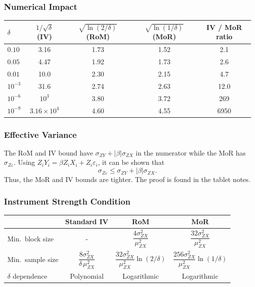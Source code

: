 \subsubsection{Numerical Impact}
 
\begin{center}
\renewcommand{\arraystretch}{1.3}
\begin{tabular}{lcccc}
\toprule
$\delta$ & $1/\sqrt{\delta}$ (IV) & $\sqrt{\ln(2/\delta)}$ (RoM) & $\sqrt{\ln(1/\delta)}$ (MoR) & IV / MoR ratio \\
\midrule
$0.10$ & 3.16 & 1.73 & 1.52 & 2.1 \\
$0.05$ & 4.47 & 1.92 & 1.73 & 2.6 \\
$0.01$ & 10.0 & 2.30 & 2.15 & 4.7 \\
$10^{-3}$ & 31.6 & 2.74 & 2.63 & 12.0 \\
$10^{-6}$ & $10^3$ & 3.80 & 3.72 & 269 \\
$10^{-9}$ & $3.16 \times 10^4$ & 4.60 & 4.55 & 6950 \\
\bottomrule
\end{tabular}
\end{center}

\subsubsection{Effective Variance}
The RoM and IV bound have $\sigma_{ZY} + |\beta|\sigma_{ZX}$ in the numerator while the MoR has $\sigma_{Z\varepsilon}$. Using $Z_iY_i = \beta Z_iX_i + Z_i\varepsilon_i$, it can be shown that
\[
    \sigma_{Z\varepsilon} \leq \sigma_{ZY} + |\beta|\sigma_{ZX}.
\]
Thus, the MoR and IV bounds are tighter. The proof is found in the tablet notes.

\subsubsection{Instrument Strength Condition}
\begin{center}
\renewcommand{\arraystretch}{1.4}
\begin{tabular}{lccc}
\toprule
 & \textbf{Standard IV} & \textbf{RoM} & \textbf{MoR} \\
\midrule
Min.\ block size & - & $\dfrac{4\sigma_{ZX}^2}{\mu_{ZX}^2}$ & $\dfrac{32\sigma_{ZX}^2}{\mu_{ZX}^2}$ \\[12pt]
Min.\ sample size & $\dfrac{8\sigma_{ZX}^2}{\delta\,\mu_{ZX}^2}$ & $\dfrac{32\sigma_{ZX}^2}{\mu_{ZX}^2}\ln(2/\delta)$ & $\dfrac{256\sigma_{ZX}^2}{\mu_{ZX}^2}\ln(1/\delta)$ \\[12pt]
$\delta$ dependence & Polynomial & Logarithmic & Logarithmic \\[4pt]
\bottomrule
\end{tabular}
\end{center}

